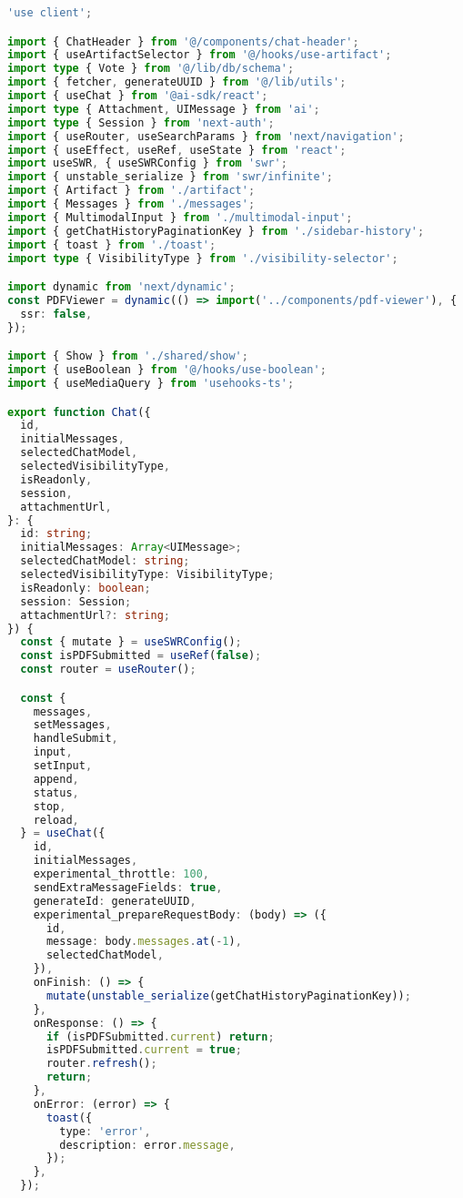 \begin{lstlisting}[language=TypeScript, caption={Chat dengan AI}]
'use client';

import { ChatHeader } from '@/components/chat-header';
import { useArtifactSelector } from '@/hooks/use-artifact';
import type { Vote } from '@/lib/db/schema';
import { fetcher, generateUUID } from '@/lib/utils';
import { useChat } from '@ai-sdk/react';
import type { Attachment, UIMessage } from 'ai';
import type { Session } from 'next-auth';
import { useRouter, useSearchParams } from 'next/navigation';
import { useEffect, useRef, useState } from 'react';
import useSWR, { useSWRConfig } from 'swr';
import { unstable_serialize } from 'swr/infinite';
import { Artifact } from './artifact';
import { Messages } from './messages';
import { MultimodalInput } from './multimodal-input';
import { getChatHistoryPaginationKey } from './sidebar-history';
import { toast } from './toast';
import type { VisibilityType } from './visibility-selector';

import dynamic from 'next/dynamic';
const PDFViewer = dynamic(() => import('../components/pdf-viewer'), {
  ssr: false,
});

import { Show } from './shared/show';
import { useBoolean } from '@/hooks/use-boolean';
import { useMediaQuery } from 'usehooks-ts';

export function Chat({
  id,
  initialMessages,
  selectedChatModel,
  selectedVisibilityType,
  isReadonly,
  session,
  attachmentUrl,
}: {
  id: string;
  initialMessages: Array<UIMessage>;
  selectedChatModel: string;
  selectedVisibilityType: VisibilityType;
  isReadonly: boolean;
  session: Session;
  attachmentUrl?: string;
}) {
  const { mutate } = useSWRConfig();
  const isPDFSubmitted = useRef(false);
  const router = useRouter();

  const {
    messages,
    setMessages,
    handleSubmit,
    input,
    setInput,
    append,
    status,
    stop,
    reload,
  } = useChat({
    id,
    initialMessages,
    experimental_throttle: 100,
    sendExtraMessageFields: true,
    generateId: generateUUID,
    experimental_prepareRequestBody: (body) => ({
      id,
      message: body.messages.at(-1),
      selectedChatModel,
    }),
    onFinish: () => {
      mutate(unstable_serialize(getChatHistoryPaginationKey));
    },
    onResponse: () => {
      if (isPDFSubmitted.current) return;
      isPDFSubmitted.current = true;
      router.refresh();
      return;
    },
    onError: (error) => {
      toast({
        type: 'error',
        description: error.message,
      });
    },
  });


\end{lstlisting}
